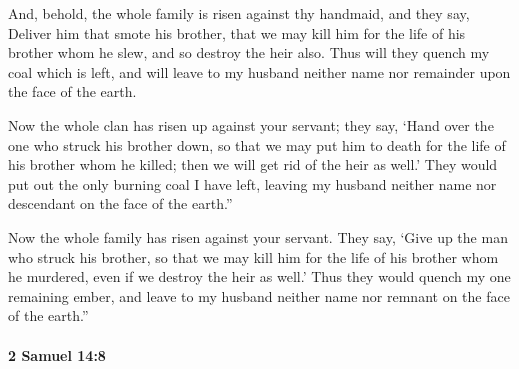 			\begin{versebox}
					\item[BHS] 
					\item[ASV] And, behold, the whole family is risen against thy handmaid, and they say, Deliver him that smote his brother, that we may kill him for the life of his brother whom he slew, and so destroy the heir also. Thus will they quench my coal which is left, and will leave to my husband neither name nor remainder upon the face of the earth.
					\item[NIV] Now the whole clan has risen up against your servant; they say, ‘Hand over the one who struck his brother down, so that we may put him to death for the life of his brother whom he killed; then we will get rid of the heir as well.’ They would put out the only burning coal I have left, leaving my husband neither name nor descendant on the face of the earth.”
					\item[NRSV] Now the whole family has risen against your servant. They say, ‘Give up the man who struck his brother, so that we may kill him for the life of his brother whom he murdered, even if we destroy the heir as well.’ Thus they would quench my one remaining ember, and leave to my husband neither name nor remnant on the face of the earth.”
			\end{versebox}

		\paragraph{2 Samuel 14:8} %
			\label{2SAMUEL-14-8}

